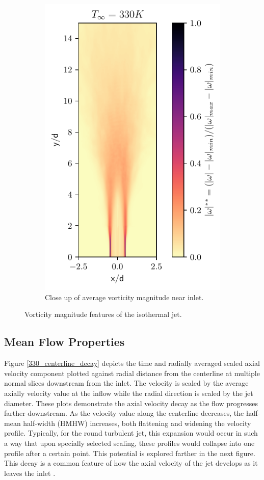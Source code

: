 \begin{figure}[htbp!]
\begin{subfigure}{0.25\textwidth}
	\includegraphics[scale=.65]{figures/Plots/vertical/330/magvort_scaled_vert_avg_330_zoom.pdf}
	\caption{Close up of average vorticity magnitude near inlet.} \label{330_magvort_4}
\end{subfigure}
\caption{Vorticity magnitude features of the isothermal jet.}
\label{330_magvort_features}
\end{figure}

\subsection{Mean Flow Properties}
Figure \ref{330_centerline_decay} depicts the time and radially averaged scaled axial velocity component plotted against radial distance from the centerline at multiple normal slices downstream from the inlet. The velocity is scaled by the average axially velocity value at the inflow while the radial direction is scaled by the jet diameter. These plots demonstrate the axial velocity decay as the flow progresses farther downstream. As the velocity value along the centerline decreases, the half-mean half-width (HMHW) increases, both flattening and widening the velocity profile. Typically, for the round turbulent jet, this expansion would occur in such a way that upon specially selected scaling, these profiles would collapse into one profile after a certain point. This potential is explored farther in the next figure. This decay is a common feature of how the axial velocity of the jet develops as it leaves the inlet \cite{Pope}. 

